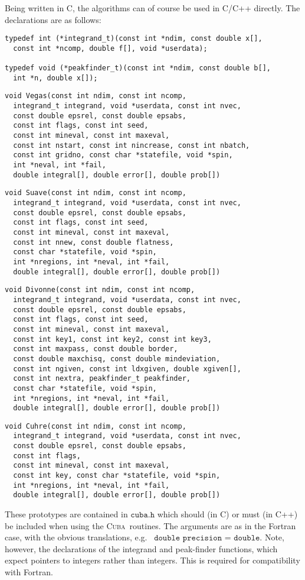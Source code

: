 \documentclass[12pt]{article}
\newcommand\cuba{\textsc{Cuba}}
\newcommand\eg{e.g.\ }
\newcommand\Code[1]{\ensuremath{\texttt{#1}}}
\begin{document}
Being written in C, the algorithms can of course be used in C/C++ 
directly.  The declarations are as follows:
\begin{verbatim}
typedef int (*integrand_t)(const int *ndim, const double x[],
  const int *ncomp, double f[], void *userdata);

typedef void (*peakfinder_t)(const int *ndim, const double b[],
  int *n, double x[]);
\end{verbatim}
\begin{verbatim}
void Vegas(const int ndim, const int ncomp,
  integrand_t integrand, void *userdata, const int nvec,
  const double epsrel, const double epsabs,
  const int flags, const int seed,
  const int mineval, const int maxeval,
  const int nstart, const int nincrease, const int nbatch,
  const int gridno, const char *statefile, void *spin,
  int *neval, int *fail,
  double integral[], double error[], double prob[])
\end{verbatim}
\begin{verbatim}
void Suave(const int ndim, const int ncomp,
  integrand_t integrand, void *userdata, const int nvec,
  const double epsrel, const double epsabs,
  const int flags, const int seed,
  const int mineval, const int maxeval,
  const int nnew, const double flatness,
  const char *statefile, void *spin,
  int *nregions, int *neval, int *fail,
  double integral[], double error[], double prob[])
\end{verbatim}
\begin{verbatim}
void Divonne(const int ndim, const int ncomp,
  integrand_t integrand, void *userdata, const int nvec,
  const double epsrel, const double epsabs,
  const int flags, const int seed,
  const int mineval, const int maxeval,
  const int key1, const int key2, const int key3,
  const int maxpass, const double border,
  const double maxchisq, const double mindeviation,
  const int ngiven, const int ldxgiven, double xgiven[],
  const int nextra, peakfinder_t peakfinder,
  const char *statefile, void *spin,
  int *nregions, int *neval, int *fail,
  double integral[], double error[], double prob[])
\end{verbatim}
\begin{verbatim}
void Cuhre(const int ndim, const int ncomp,
  integrand_t integrand, void *userdata, const int nvec,
  const double epsrel, const double epsabs,
  const int flags,
  const int mineval, const int maxeval,
  const int key, const char *statefile, void *spin,
  int *nregions, int *neval, int *fail,
  double integral[], double error[], double prob[])
\end{verbatim}
These prototypes are contained in \Code{cuba.h} which should (in C) or
must (in C++) be included when using the \cuba\ routines.  The arguments
are as in the Fortran case, with the obvious translations, \eg
\Code{double precision} = \Code{double}.  Note, however, the
declarations of the integrand and peak-finder functions, which expect
pointers to integers rather than integers.  This is required for
compatibility with Fortran.
\end{document}
